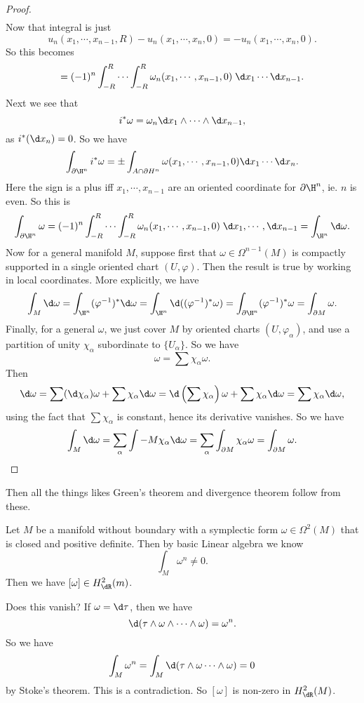 \documentclass[a4paper]{article}
\begin{document}
\begin{proof}
\begin{align*}
  \end{align*}
  Now that integral is just
  \[
    u_n(x_1, \cdots, x_{n - 1}, R) - u_n(x_1, \cdots, x_n, 0) = -u_n(x_1, \cdots, x_n, 0).
  \]
  So this becomes
  \[
    =(-1)^n \int_{-R}^R \cdots \int_{-R}^R \omega_n(x_1, \cdots, x_{n - 1}, 0)\;\d x_1 \cdots \d x_{n - 1}.
  \]
  Next we see that
  \[
    i^* \omega = \omega_n \d x_1 \wedge \cdots \wedge \d x_{n - 1},
  \]
  as $i^*(\d x_n) = 0$. So we have
  \[
    \int_{\partial \H^n} i^* \omega = \pm \int_{A \cap \partial H^n} \omega(x_1, \cdots, x_{n - 1}, 0) \d x_1 \cdots \d x_n.
  \]
  Here the sign is a plus iff $x_1, \cdots, x_{n - 1}$ are an oriented coordinate for $\partial \H^n$, ie. $n$ is even. So this is
  \[
    \int_{\partial \H^n} \omega = (-1)^n \int_{-R}^R \cdots \int_{-R}^R \omega_n(x_1, \cdots, x_{n - 1}, 0)\;\d x_1, \cdots, \d x_{n - 1} = \int_{\H^n} \d \omega.
  \]
  Now for a general manifold $M$, suppose first that $\omega \in \Omega^{n - 1}(M)$ is compactly supported in a single oriented chart $(U, \varphi)$. Then the result is true by working in local coordinates. More explicitly, we have
  \[
    \int_M \d \omega = \int_{\H^n}(\varphi^{-1})^* \d \omega = \int_{\H^n} \d((\varphi^{-1})^* \omega) = \int_{\partial \H^n} (\varphi^{-1})^* \omega = \int_{\partial M} \omega.
  \]
  Finally, for a general $\omega$, we just cover $M$ by oriented charts $(U, \varphi_\alpha)$, and use a partition of unity $\chi_\alpha$ subordinate to $\{U_\alpha\}$. So we have
  \[
    \omega = \sum \chi_\alpha \omega.
  \]
  Then
  \[
    \d \omega = \sum (\d \chi_\alpha) \omega + \sum \chi_\alpha \d \omega = \d\left(\sum \chi_\alpha\right) \omega + \sum \chi_\alpha \d \omega = \sum \chi_\alpha \d \omega,
  \]
  using the fact that $\sum \chi_\alpha$ is constant, hence its derivative vanishes. So we have
  \[
    \int_M \d \omega = \sum_\alpha \int-M \chi_\alpha \d \omega = \sum_\alpha \int_{\partial M} \chi_\alpha \omega = \int_{\partial M}\omega.
  \]
\end{proof}
Then all the things likes Green's theorem and divergence theorem follow from these.

\begin{eg}
  Let $M$ be a manifold without boundary with a symplectic form $\omega \in \Omega^2(M)$ that is closed and positive definite. Then by basic Linear algebra we know
  \[
    \int_M \omega^n \not= 0.
  \]
  Then we have $[\omega] \in H_{\dR}^2 (m)$.

  Does this vanish? If $\omega = \d \tau$, then we have
  \[
    \d (\tau \wedge \omega \wedge \cdots \wedge \omega) = \omega^n.
  \]
  So we have
  \[
    \int_M \omega^n = \int_M \d (\tau \wedge \omega \cdots \wedge \omega) = 0
  \]
  by Stoke's theorem. This is a contradiction. So $[\omega]$ is non-zero in $H^2_{\dR}(M)$.
\end{eg}
\end{document}
